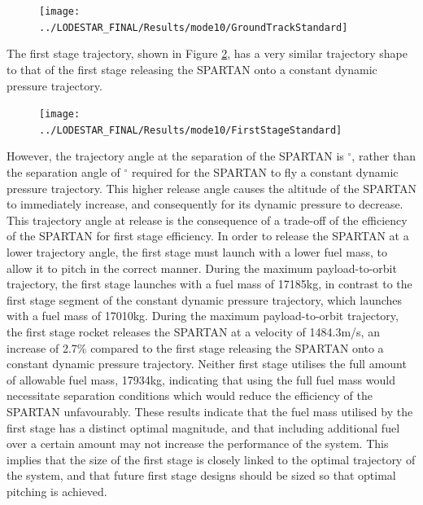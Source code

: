 \begin{figure}[ht!]
	
	
	
	\centering
	\texttt{[image: ../LODESTAR\_FINAL/Results/mode10/GroundTrackStandard]}
	\caption{}
	\label{fig:GroundTrackStandardNoReturn}
\end{figure}


The first stage trajectory, shown in Figure \ref{fig:FirstStageStandardNoReturn}, has a very similar trajectory shape to that of the first stage releasing the SPARTAN onto a constant dynamic pressure trajectory.
\begin{figure}[ht!]
	\centering
	\texttt{[image: ../LODESTAR\_FINAL/Results/mode10/FirstStageStandard]}
	\caption{}
	\label{fig:FirstStageStandardNoReturn}
\end{figure}
 However, the trajectory angle at the separation of the SPARTAN is \secondthirdSeparationgammaqStandardNoReturn$^\circ$, rather than the separation angle of \secondthirdSeparationgammaConstq$^\circ$ required for the SPARTAN to fly a constant dynamic pressure trajectory. This higher release angle causes the altitude of the SPARTAN to immediately increase, and consequently for its dynamic pressure to decrease. This trajectory angle at release is the consequence of a trade-off of the efficiency of the SPARTAN for first stage efficiency. In order to release the SPARTAN at a lower trajectory angle, the first stage must launch with a lower fuel mass, to allow it to pitch in the correct manner. During the maximum payload-to-orbit trajectory, the first stage launches with a fuel mass of 17185kg, in contrast to the first stage segment of the constant dynamic pressure trajectory, which launches with a fuel mass of 17010kg. During the maximum payload-to-orbit trajectory, the first stage rocket releases the SPARTAN at a velocity of 1484.3m/s, an increase of 2.7\% compared to the first stage releasing the SPARTAN onto a constant dynamic pressure trajectory. Neither first stage utilises the full amount of allowable fuel mass, 17934kg, indicating that using the full fuel mass would necessitate separation conditions which would reduce the efficiency of the SPARTAN unfavourably. 
These results indicate that the fuel mass utilised by the first stage has a distinct optimal magnitude, and that including additional fuel over a certain amount may not increase the performance of the system. This implies that the size of the first stage is closely linked to the optimal trajectory of the system, and that future first stage designs should be sized so that optimal pitching is achieved. 

